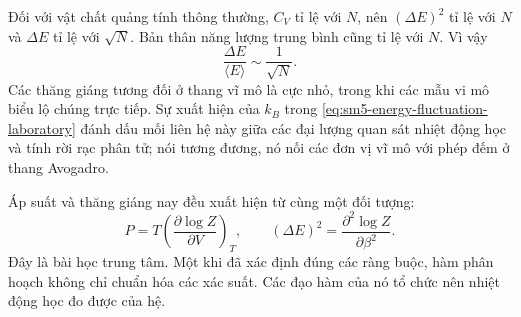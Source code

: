 \begin{classroomqa}
\end{classroomqa}

Đối với vật chất quảng tính thông thường, \(C_V\) tỉ lệ với \(N\), nên
\((\Delta E)^2\) tỉ lệ với \(N\) và \(\Delta E\) tỉ lệ với
\(\sqrt{N}\). Bản thân năng lượng trung bình cũng tỉ lệ với \(N\). Vì vậy
\begin{equation}
 \frac{\Delta E}{\langle E\rangle}\sim\frac{1}{\sqrt{N}}.
 \label{eq:sm5-relative-fluctuation-scaling}
\end{equation}
Các thăng giáng tương đối ở thang vĩ mô là cực nhỏ, trong khi các mẫu vi mô biểu lộ chúng trực tiếp. Sự xuất hiện của \(k_B\) trong
\eqref{eq:sm5-energy-fluctuation-laboratory} đánh dấu mối liên hệ này giữa các đại lượng quan sát nhiệt động học và tính rời rạc phân tử; nói tương đương, nó nối các đơn vị vĩ mô với phép đếm ở thang Avogadro.

Áp suất và thăng giáng nay đều xuất hiện từ cùng một đối tượng:
\[
 P=T\left(\frac{\partial\log Z}{\partial V}\right)_T,
 \qquad
 (\Delta E)^2=\frac{\partial^2\log Z}{\partial\beta^2}.
\]
Đây là bài học trung tâm. Một khi đã xác định đúng các ràng buộc, hàm phân hoạch không chỉ chuẩn hóa các xác suất. Các đạo hàm của nó tổ chức nên nhiệt động học đo được của hệ.